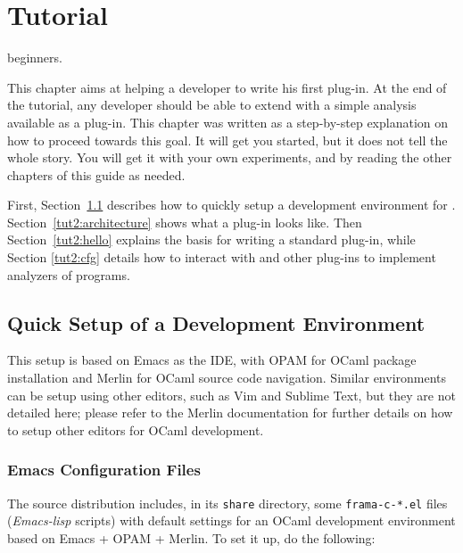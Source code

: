 
\chapter{Tutorial}\label{chap:tutorial}

\begin{target}beginners.\end{target}

This chapter aims at helping a developer to write his first \framac plug-in. At
the end of the tutorial, any developer should be able to extend \framac with a
simple analysis available as a \framac plug-in. This chapter was written as a
step-by-step explanation on how to proceed towards this goal. It will get you
started, but it does not tell the whole story. You will get it with your own
experiments, and by reading the other chapters of this guide as needed.

First, Section~\ref{tut2:environment} describes how to quickly setup a
development environment for \framac.
Section~\ref{tut2:architecture} shows what a plug-in looks like. Then
Section~\ref{tut2:hello} explains the basis for writing a standard \framac
plug-in, while Section \ref{tut2:cfg} details how to interact
with \framac and other plug-ins to implement analyzers of \C programs.

\section{Quick Setup of a Development Environment}\label{tut2:environment}

This setup is based on Emacs as the IDE, with OPAM for OCaml package
installation and Merlin for OCaml source code navigation.
Similar environments can be setup using other editors, such as Vim and
Sublime Text, but they are not detailed here; please refer to the Merlin
documentation for further details on how to setup other editors for OCaml
development.

\subsection{Emacs Configuration Files}

The \framac source distribution includes, in its \texttt{share} directory,
some \texttt{frama-c-*.el} files ({\em Emacs-lisp} scripts)
with default settings for an OCaml development environment based on
Emacs + OPAM + Merlin. To set it up, do the following:

